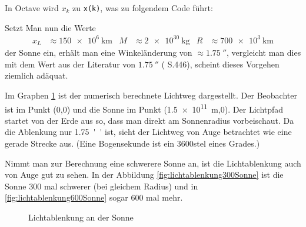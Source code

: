 \begin{refsection}
\begin{beispiel}
  In Octave wird \(x_k\) zu \texttt{x(k)}, was zu folgendem Code
  führt:
  

  Setzt Man nun die Werte
  \begin{align*}
    x_L &\approx \SI{150e6}{\kilo\meter} &M &\approx
                                              \SI{2e30}{\kilogram}
    &R &\approx \SI{700e3}{\kilo\meter}
  \end{align*}
  der Sonne ein,
  erhält man eine Winkeländerung von \(\approx \SI{1.75}{''}\),
  vergleicht man dies mit dem Wert aus der Literatur von
  \(\SI{1.75}{''}\) (\cite{misner1973gravitation} S.446), scheint
  dieses Vorgehen ziemlich adäquat.

  Im Graphen \ref{fig:lichtablenkungSonne} ist der numerisch
  berechnete Lichtweg dargestellt.  Der Beobachter ist im Punkt (0,0)
  und die Sonne im Punkt (\SI{1.5e11}{\meter},0).  Der Lichtpfad
  startet von der Erde aus so, dass man direkt am Sonnenradius
  vorbeischaut.  Da die Ablenkung nur \SI{1.75}{''} ist, sieht der Lichtweg
  von Auge betrachtet wie eine gerade Strecke aus.  (Eine Bogensekunde
  ist ein 3600stel eines Grades.)

  Nimmt man zur Berechnung eine schwerere Sonne an, ist die
  Lichtablenkung auch von Auge gut zu sehen.  In der Abbildung
  \ref{fig:lichtablenkung300Sonne} ist die Sonne 300 mal schwerer (bei
  gleichem Radius) und in \ref{fig:lichtablenkung600Sonne} sogar 600
  mal mehr.

  \begin{figure}
    \centering
    \caption{Lichtablenkung an der Sonne}
    \label{fig:lichtablenkungSonne}
  \end{figure}
  

\end{beispiel}
\end{refsection}

